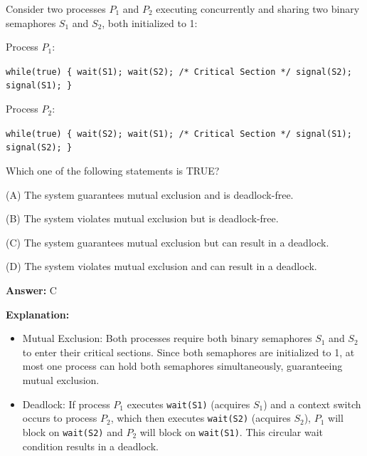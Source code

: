 \begin{tcolorbox}[enhanced,breakable,colback=boxgray,colframe=gray!45,boxrule=0.4pt,arc=2pt,left=6pt,right=6pt,top=4pt,bottom=4pt,title={Q.41},fonttitle=\bfseries\small,coltitle=black,colbacktitle=gray!15]
\small Consider two processes $P_1$ and $P_2$ executing concurrently and sharing two binary semaphores $S_1$ and $S_2$, both initialized to 1:\par
Process $P_1$:\par
\texttt{while(true) \{ wait(S1); wait(S2); /* Critical Section */ signal(S2); signal(S1); \}}\par
Process $P_2$:\par
\texttt{while(true) \{ wait(S2); wait(S1); /* Critical Section */ signal(S1); signal(S2); \}}\par
Which one of the following statements is TRUE?\par\par\hspace*{1em}(A) The system guarantees mutual exclusion and is deadlock-free.\par\hspace*{1em}(B) The system violates mutual exclusion but is deadlock-free.\par\hspace*{1em}(C) The system guarantees mutual exclusion but can result in a deadlock.\par\hspace*{1em}(D) The system violates mutual exclusion and can result in a deadlock.\par{}\par\smallskip\textbf{Answer:} C\par\par\textbf{Explanation:} \begin{itemize}[leftmargin=1.4em,itemsep=1pt]
\item Mutual Exclusion: Both processes require both binary semaphores $S_1$ and $S_2$ to enter their critical sections. Since both semaphores are initialized to 1, at most one process can hold both semaphores simultaneously, guaranteeing mutual exclusion.
\item Deadlock: If process $P_1$ executes \texttt{wait(S1)} (acquires $S_1$) and a context switch occurs to process $P_2$, which then executes \texttt{wait(S2)} (acquires $S_2$), $P_1$ will block on \texttt{wait(S2)} and $P_2$ will block on \texttt{wait(S1)}. This circular wait condition results in a deadlock.
\end{itemize}
\end{tcolorbox}


